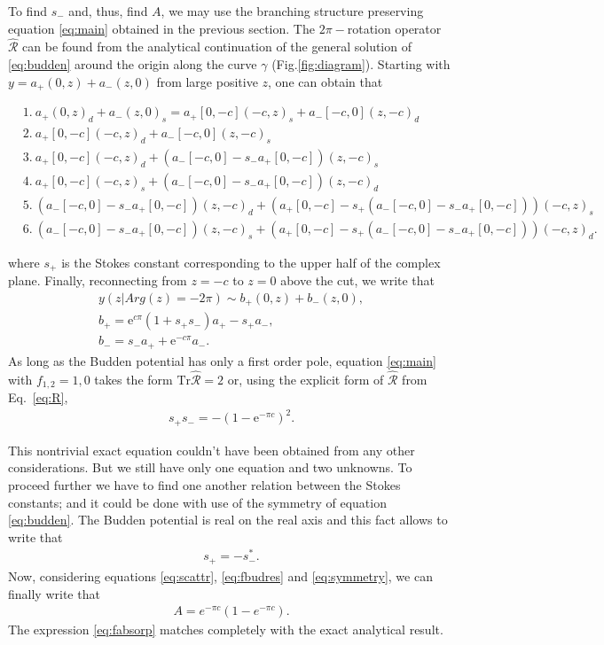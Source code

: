 \documentclass[aip,jmp,reprint]{revtex4-1}
\def\rme{\mathrm{e}}
\def\R{\widehat{\mathcal{R}}}
\def\Tr{\mathrm{Tr}}
\begin{document}
To find $s_-$ and, thus, find $A$, we may use the branching structure preserving 
equation \eqref{eq:main} obtained in the previous section. The $2\pi-$rotation operator $\R$
can be found from the analytical continuation of the general solution of \eqref{eq:budden}
around the origin along the curve $\gamma$ (Fig.\ref{fig:diagram}). 
Starting with $y=a_+(0,z) + a_-(z,0)$ from large positive $z$, 
one can obtain that
\begin{widetext}
\begin{equation}
\begin{split}
&1.\ a_+(0,z)_d+a_-(z,0)_s=a_+[0,-c](-c,z)_s + a_-[-c,0](z,-c)_d
\\
&2.\ a_+[0,-c](-c,z)_d + a_-[-c,0](z,-c)_s 
\\
&3.\ a_+[0,-c](-c,z)_d + (a_-[-c,0] - s_- a_+[0,-c])(z,-c)_s 
\\
&4.\ a_+[0,-c](-c,z)_s + (a_-[-c,0] - s_- a_+[0,-c])(z,-c)_d 
\\
&5.\ (a_-[-c,0] - s_- a_+[0,-c])(z,-c)_d + (a_+[0,-c] - s_+ (a_-[-c,0] - s_- a_+[0,-c]))(-c,z)_s
\\
&6.\ (a_-[-c,0] - s_- a_+[0,-c])(z,-c)_s + (a_+[0,-c] - s_+ (a_-[-c,0] - s_- a_+[0,-c]))(-c,z)_d.
\end{split}
\end{equation}
\end{widetext}
where $s_+$ is the Stokes constant corresponding to the upper half of the complex plane.
Finally, reconnecting from $z=-c$ to $z=0$ above the cut, we write that
\begin{equation}
\begin{split}
y(z | Arg(z) = -2\pi) \sim b_+(0,z) + b_-(z,0),
\\
b_+ = \rme^{c \pi} (1 + s_+s_-)a_+ - s_+a_-,
\\
b_- = s_- a_+ + \rme^{-c \pi} a_-.
\label{eq:R} 
\end{split}
\end{equation}
As long as the Budden potential has only a first order pole, equation \eqref{eq:main}
with $f_{1,2}=1,0$ takes the form $\Tr\R=2$ or, using the explicit form of $\R$ from Eq.~\eqref{eq:R},
\begin{eqnarray}
s_+s_- = - (1-\rme^{- \pi c})^2.
\label{eq:fbudres}
\end{eqnarray}

This nontrivial exact equation couldn't have been obtained from any other considerations. But we
still have only one equation and two unknowns. To proceed further we have to find one another
relation between the Stokes constants; and it could be done with use of the symmetry 
of equation \eqref{eq:budden}. The Budden potential is real on the real axis and
this fact allows to write\cite{aksymm,frsymm} that
\begin{eqnarray}
s_+ = -s_-^*.
\label{eq:symmetry}
\end{eqnarray}
Now, considering equations \eqref{eq:scattr}, \eqref{eq:fbudres} and \eqref{eq:symmetry}, we can
finally write that
\begin{eqnarray}
A = e^{-\pi c}(1-e^{-\pi c}).
\label{eq:fabsorp}
\end{eqnarray}
The expression \eqref{eq:fabsorp} matches completely with the exact analytical result\cite{rwbook}.
\end{document}
